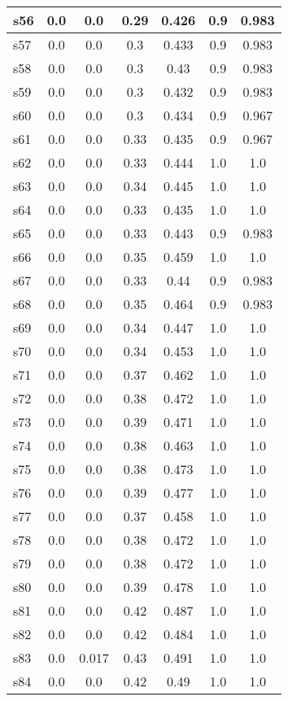 \documentclass{article}
\begin{document}
\begin{tabular}{|l|c|c|c|c|c|c|}
\hline
s56 &0.0 & 0.0 & 0.29 & 0.426 & 0.9 & 0.983\\
\hline
s57 &0.0 & 0.0 & 0.3 & 0.433 & 0.9 & 0.983\\
\hline
s58 &0.0 & 0.0 & 0.3 & 0.43 & 0.9 & 0.983\\
\hline
s59 &0.0 & 0.0 & 0.3 & 0.432 & 0.9 & 0.983\\
\hline
s60 &0.0 & 0.0 & 0.3 & 0.434 & 0.9 & 0.967\\
\hline
s61 &0.0 & 0.0 & 0.33 & 0.435 & 0.9 & 0.967\\
\hline
s62 &0.0 & 0.0 & 0.33 & 0.444 & 1.0 & 1.0\\
\hline
s63 &0.0 & 0.0 & 0.34 & 0.445 & 1.0 & 1.0\\
\hline
s64 &0.0 & 0.0 & 0.33 & 0.435 & 1.0 & 1.0\\
\hline
s65 &0.0 & 0.0 & 0.33 & 0.443 & 0.9 & 0.983\\
\hline
s66 &0.0 & 0.0 & 0.35 & 0.459 & 1.0 & 1.0\\
\hline
s67 &0.0 & 0.0 & 0.33 & 0.44 & 0.9 & 0.983\\
\hline
s68 &0.0 & 0.0 & 0.35 & 0.464 & 0.9 & 0.983\\
\hline
s69 &0.0 & 0.0 & 0.34 & 0.447 & 1.0 & 1.0\\
\hline
s70 &0.0 & 0.0 & 0.34 & 0.453 & 1.0 & 1.0\\
\hline
s71 &0.0 & 0.0 & 0.37 & 0.462 & 1.0 & 1.0\\
\hline
s72 &0.0 & 0.0 & 0.38 & 0.472 & 1.0 & 1.0\\
\hline
s73 &0.0 & 0.0 & 0.39 & 0.471 & 1.0 & 1.0\\
\hline
s74 &0.0 & 0.0 & 0.38 & 0.463 & 1.0 & 1.0\\
\hline
s75 &0.0 & 0.0 & 0.38 & 0.473 & 1.0 & 1.0\\
\hline
s76 &0.0 & 0.0 & 0.39 & 0.477 & 1.0 & 1.0\\
\hline
s77 &0.0 & 0.0 & 0.37 & 0.458 & 1.0 & 1.0\\
\hline
s78 &0.0 & 0.0 & 0.38 & 0.472 & 1.0 & 1.0\\
\hline
s79 &0.0 & 0.0 & 0.38 & 0.472 & 1.0 & 1.0\\
\hline
s80 &0.0 & 0.0 & 0.39 & 0.478 & 1.0 & 1.0\\
\hline
s81 &0.0 & 0.0 & 0.42 & 0.487 & 1.0 & 1.0\\
\hline
s82 &0.0 & 0.0 & 0.42 & 0.484 & 1.0 & 1.0\\
\hline
s83 &0.0 & 0.017 & 0.43 & 0.491 & 1.0 & 1.0\\
\hline
s84 &0.0 & 0.0 & 0.42 & 0.49 & 1.0 & 1.0\\

\end{tabular}
\end{document}
